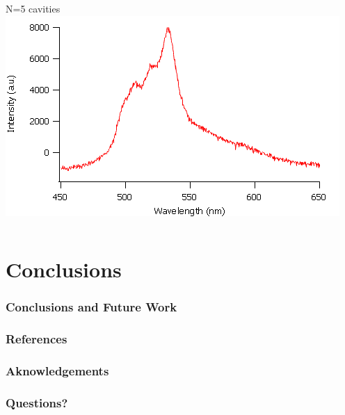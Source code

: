 \documentclass{beamer}
\begin{document}
\begin{frame}
\begin{columns}
\begin{column}{0.5\textwidth}
					N=5 cavities\\
					\includegraphics[width=\textwidth]{images/n5_fe.png}
				\end{column}
            \end{columns}
        \end{frame}
        
\section{Conclusions}
    \frame{\tableofcontents[currentsection]}
    \begin{frame}
        \frametitle{Conclusions and Future Work}
    \end{frame}
    
    \begin{frame}
        \frametitle{References}
    \end{frame}
    
    \begin{frame}
        \frametitle{Aknowledgements}
    \end{frame}
    
    \begin{frame}
        \frametitle{Questions?}
    \end{frame}
    
\end{document}
